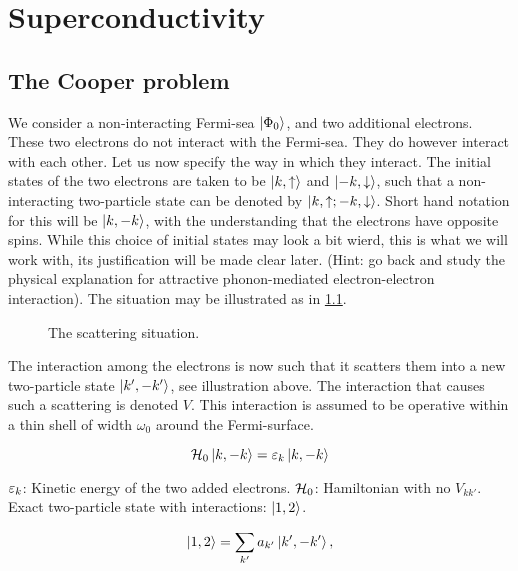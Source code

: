 \chapter{Superconductivity}
\section{The Cooper problem}

We consider a non-interacting Fermi-sea $\ket{\Phi_0}$, and two additional electrons. These two electrons do not interact with the Fermi-sea. They do however interact with each other. Let us now specify the way in which they interact. The initial states of the two electrons are taken to be $\ket{k,\uparrow}$ and $\ket{-k, \downarrow}$, such that a non-interacting two-particle state can be denoted by $\ket{k, \uparrow; -k, \downarrow}$. Short hand notation for this will be $\ket{k, -k}$, with the understanding that the electrons have opposite spins. While this choice of initial states may look a bit wierd, this is what we will work with, its justification will be made clear later. (Hint: go back and study the physical explanation for attractive phonon-mediated electron-electron interaction). The situation may be illustrated as in \cref{fig:cooper_situation}.

\begin{figure}
	\centering
	
	\caption{The scattering situation. }
	\label{fig:cooper_situation}
\end{figure}

The interaction among the electrons is now such that it scatters them into a new two-particle state $\ket{k', -k'}$, see illustration above. The interaction that causes such a scattering is denoted $V$. This interaction is assumed to be operative within a thin shell of width $\omega_0$ around the Fermi-surface. 

\begin{equation}
\mathcal{H}_0 \ket{k,-k} = \varepsilon_k \ket{k,-k}
\end{equation}

$\varepsilon_k$: Kinetic energy of the two added electrons. $\mathcal{H}_0$: Hamiltonian with no $V_{kk'}$. \\

Exact two-particle state with interactions: $\ket{1,2}$. 

\begin{equation}
\ket{1,2} = \sum_{k'} a_{k'}\ket{k', -k'},
\end{equation}

